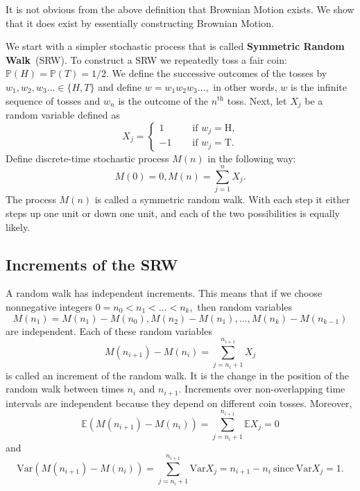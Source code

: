 \documentclass[reqno,psamsfonts, 10pt]{amsart}
\theoremstyle{remark}
\begin{document}
It is not obvious from the above definition that Brownian
Motion exists. We show that it does exist by essentially
constructing Brownian Motion.

We start with a simpler stochastic process that is called
\textbf{Symmetric Random Walk}~(SRW).  To construct a SRW we
repeatedly toss a fair coin: $\mathbb{P}(H) = \mathbb{P}(T) =
1/2.$ We define the successive outcomes of the tosses by $w_1,
w_2, w_3 \dots \in \{H,T\}$ and define $w = w_1 w_2 w_3 \dots,$ in
other words, $w$ is the infinite sequence of tosses and $w_n$ is
the outcome of the $n^{\mbox{th}}$ toss. Next, let $X_j$ be a
random variable defined as
\begin{equation}
X_j =
\begin{cases}
1  \quad & \mbox{ if } w_j = \mbox{H,} \nonumber \\
-1 \quad & \mbox{ if } w_j = \mbox{T.} \nonumber
\end{cases}
\end{equation}
Define discrete-time stochastic process $M(n)$ in the
following way: $$M(0) = 0, M(n) = \sum \limits_{j=1}^{n}
X_j.$$ The process $M(n)$ is called a symmetric random
walk. With each step it either steps up one unit or down
one unit, and each of the two possibilities is equally
likely.

\bigskip




\subsection*{Increments of the SRW} A random walk has
independent increments. This means that if we choose nonnegative
integers $0 = n_0 < n_1 < \dots < n_k,$ then random variables
$$
M(n_1) = M(n_1) - M(n_0), M(n_2) - M(n_1), \dots, M(n_k) -
M(n_{k-1})
$$
are independent. Each of these random variables
$$
M(n_{i+1}) - M(n_i) = \sum \limits_{j = n_i + 1}^{n_{i+1}}
X_j
$$
is called an increment of the random walk. It is the change
in the position of the random walk between times $n_i$ and
$n_{i+1}.$ Increments over non-overlapping time intervals
are independent because they depend on different coin
tosses. Moreover,
$$
\mathbb{E}(M(n_{i+1}) - M(n_i)) = \sum \limits_{j = n_i
+1}^{n_{i+1}} \mathbb{E} X_j = 0
$$
and
$$
\mbox{Var} (M(n _{i+1}) - M(n_i)) = \sum \limits_{j = n_i
+1}^{n_{i+1}} \mbox{Var} X_j = n_{i+1} - n_i \ \mbox{since}
\ \mbox{Var} X_j = 1.
$$
\end{document}
